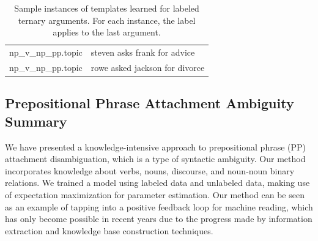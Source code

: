 \begin{table}[h]
\begin{tabular}{ll}
np\_v\_np\_pp.topic& steven	asks	frank	for	advice	 \\
np\_v\_np\_pp.topic&	rowe	asked	jackson	for	divorce	 \\
            \hline
     \end{tabular}
     \caption{Sample instances of    templates learned for labeled ternary arguments. For each instance, the label applies
     to the last argument.}
       \label{tab:ternarylabels}
     \end{table}

\subsection{Prepositional Phrase Attachment Ambiguity  Summary}
We have presented a knowledge-intensive  approach to prepositional phrase (PP) attachment disambiguation, which is  a type of syntactic ambiguity. Our method incorporates  knowledge about verbs, nouns, discourse, and noun-noun binary relations.   We trained a model using labeled data and unlabeled data, making use of expectation maximization for  parameter estimation.
Our method can be seen as an example of tapping into a positive feedback loop for machine reading, which has only become possible in recent years due to the progress made by  information extraction and knowledge base construction techniques.


 
 
